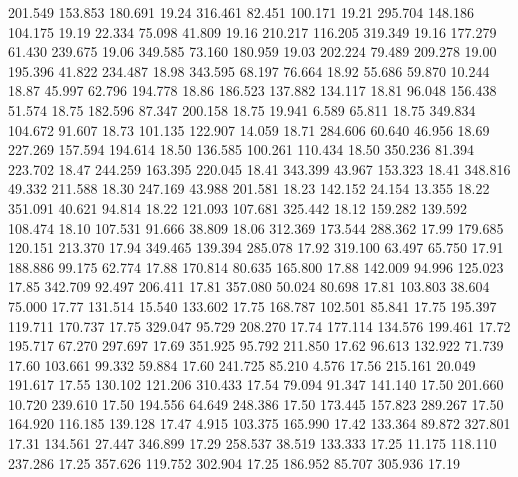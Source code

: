 201.549  153.853  180.691        19.24
 316.461   82.451  100.171        19.21
 295.704  148.186  104.175        19.19
  22.334   75.098   41.809        19.16
 210.217  116.205  319.349        19.16
 177.279   61.430  239.675        19.06
 349.585   73.160  180.959        19.03
 202.224   79.489  209.278        19.00
 195.396   41.822  234.487        18.98
 343.595   68.197   76.664        18.92
  55.686   59.870   10.244        18.87
  45.997   62.796  194.778        18.86
 186.523  137.882  134.117        18.81
  96.048  156.438   51.574        18.75
 182.596   87.347  200.158        18.75
  19.941    6.589   65.811        18.75
 349.834  104.672   91.607        18.73
 101.135  122.907   14.059        18.71
 284.606   60.640   46.956        18.69
 227.269  157.594  194.614        18.50
 136.585  100.261  110.434        18.50
 350.236   81.394  223.702        18.47
 244.259  163.395  220.045        18.41
 343.399   43.967  153.323        18.41
 348.816   49.332  211.588        18.30
 247.169   43.988  201.581        18.23
 142.152   24.154   13.355        18.22
 351.091   40.621   94.814        18.22
 121.093  107.681  325.442        18.12
 159.282  139.592  108.474        18.10
 107.531   91.666   38.809        18.06
 312.369  173.544  288.362        17.99
 179.685  120.151  213.370        17.94
 349.465  139.394  285.078        17.92
 319.100   63.497   65.750        17.91
 188.886   99.175   62.774        17.88
 170.814   80.635  165.800        17.88
 142.009   94.996  125.023        17.85
 342.709   92.497  206.411        17.81
 357.080   50.024   80.698        17.81
 103.803   38.604   75.000        17.77
 131.514   15.540  133.602        17.75
 168.787  102.501   85.841        17.75
 195.397  119.711  170.737        17.75
 329.047   95.729  208.270        17.74
 177.114  134.576  199.461        17.72
 195.717   67.270  297.697        17.69
 351.925   95.792  211.850        17.62
  96.613  132.922   71.739        17.60
 103.661   99.332   59.884        17.60
 241.725   85.210    4.576        17.56
 215.161   20.049  191.617        17.55
 130.102  121.206  310.433        17.54
  79.094   91.347  141.140        17.50
 201.660   10.720  239.610        17.50
 194.556   64.649  248.386        17.50
 173.445  157.823  289.267        17.50
 164.920  116.185  139.128        17.47
   4.915  103.375  165.990        17.42
 133.364   89.872  327.801        17.31
 134.561   27.447  346.899        17.29
 258.537   38.519  133.333        17.25
  11.175  118.110  237.286        17.25
 357.626  119.752  302.904        17.25
 186.952   85.707  305.936        17.19
